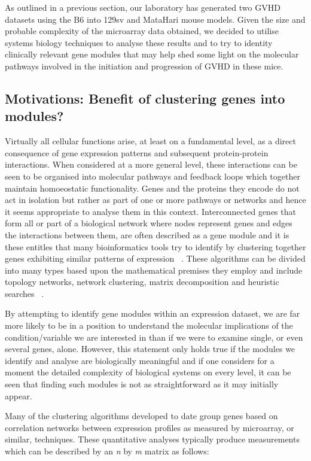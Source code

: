 As outlined in a previous section, our laboratory has generated two GVHD datasets using the B6 into 129sv and MataHari mouse models. Given the size and probable complexity of the microarray data obtained, we decided to utilise systems biology techniques to analyse these results and to try to identity clinically relevant gene modules that may help shed some light on the molecular pathways involved in the initiation and progression of GVHD in these mice. 

\subsection{Motivations: Benefit of clustering genes into modules?}

Virtually all cellular functions arise, at least on a fundamental level, as a direct consequence of gene expression patterns and subsequent protein-protein interactions. When considered at a more general level, these interactions can be seen to be organised into molecular pathways and feedback loops which together maintain homoeostatic functionality. Genes and the proteins they encode do not act in isolation but rather as part of one or more pathways or networks and hence it seems appropriate to analyse them in this context. Interconnected genes that form all or part of a biological network where nodes represent genes and edges the interactions between them, are often described as a gene module and it is these entitles that many bioinformatics tools try to identify by clustering together genes exhibiting similar patterns of expression ~\autocite{Lys2011}. These algorithms can be divided into many types based upon the mathematical premises they employ and include topology networks, network clustering, matrix decomposition and heuristic searches ~\autocite{Li2015}.

By attempting to identify gene modules within an expression dataset, we are far more likely to be in a position to understand the molecular implications of the condition/variable we are interested in than if we were to examine single, or even several genes, alone. However, this statement only holds true if the modules we identify and analyse are biologically meaningful and if one considers for a moment the detailed complexity of biological systems on every level, it can be seen that finding such modules is not as straightforward as it may initially appear. 

Many of the clustering algorithms developed to date group genes based on correlation networks between expression profiles as measured by microarray, or similar, techniques. These quantitative analyses typically produce measurements which can be described by an \textit{n} by \textit{m} matrix as follows: 

